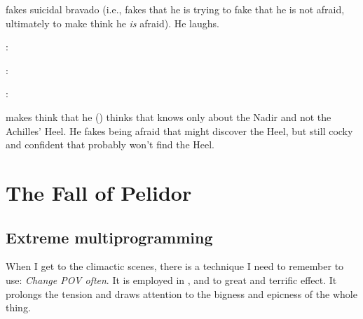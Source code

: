 \begin{garbage}
\Ishnaruchaefir{} fakes suicidal bravado (i.e., fakes that he is trying to fake that he is not afraid, ultimately to make \Teshrial{} think he \emph{is} afraid).
He laughs.

\begin{prose}
  \Ishnaruchaefir: 
  
  \Teshrial:
  
  \Ishnaruchaefir:
\end{prose}

\Ishnaruchaefir{} makes \Teshrial{} think that he (\Ishnaruchaefir) thinks that \Teshrial{} knows only about the Nadir and not the Achilles' Heel. 
He fakes being afraid that \Teshrial{} might discover the Heel, but still cocky and confident that \Teshrial{} probably won't find the Heel. 

















\section{The Fall of Pelidor}





\subsection{Extreme multiprogramming}
When I get to the climactic scenes, there is a technique I need to remember to use: 
\emph{Change POV often}. 
It is employed in \cite{StevenEriksonIanCameronEsslemont:MalazanBookoftheFallen}, and to great and terrific effect. 
It prolongs the tension and draws attention to the bigness and epicness of the whole thing. 


\end{garbage}
